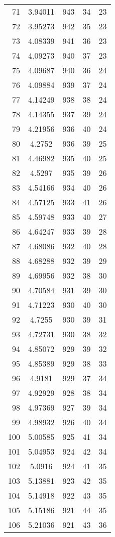 \documentclass[12pt,a4paper]{article}
\begin{document}
\begin{tabular}{r|cccc}
	71 & 3.94011 & 943 & 34 & 23 \\
	72 & 3.95273 & 942 & 35 & 23 \\
	73 & 4.08339 & 941 & 36 & 23 \\
	74 & 4.09273 & 940 & 37 & 23 \\
	75 & 4.09687 & 940 & 36 & 24 \\
	76 & 4.09884 & 939 & 37 & 24 \\
	77 & 4.14249 & 938 & 38 & 24 \\
	78 & 4.14355 & 937 & 39 & 24 \\
	79 & 4.21956 & 936 & 40 & 24 \\
	80 & 4.2752 & 936 & 39 & 25 \\
	81 & 4.46982 & 935 & 40 & 25 \\
	82 & 4.5297 & 935 & 39 & 26 \\
	83 & 4.54166 & 934 & 40 & 26 \\
	84 & 4.57125 & 933 & 41 & 26 \\
	85 & 4.59748 & 933 & 40 & 27 \\
	86 & 4.64247 & 933 & 39 & 28 \\
	87 & 4.68086 & 932 & 40 & 28 \\
	88 & 4.68288 & 932 & 39 & 29 \\
	89 & 4.69956 & 932 & 38 & 30 \\
	90 & 4.70584 & 931 & 39 & 30 \\
	91 & 4.71223 & 930 & 40 & 30 \\
	92 & 4.7255 & 930 & 39 & 31 \\
	93 & 4.72731 & 930 & 38 & 32 \\
	94 & 4.85072 & 929 & 39 & 32 \\
	95 & 4.85389 & 929 & 38 & 33 \\
	96 & 4.9181 & 929 & 37 & 34 \\
	97 & 4.92929 & 928 & 38 & 34 \\
	98 & 4.97369 & 927 & 39 & 34 \\
	99 & 4.98932 & 926 & 40 & 34 \\
	100 & 5.00585 & 925 & 41 & 34 \\
	101 & 5.04953 & 924 & 42 & 34 \\
	102 & 5.0916 & 924 & 41 & 35 \\
	103 & 5.13881 & 923 & 42 & 35 \\
	104 & 5.14918 & 922 & 43 & 35 \\
	105 & 5.15186 & 921 & 44 & 35 \\
	106 & 5.21036 & 921 & 43 & 36 \\

\end{tabular}
\end{document}
